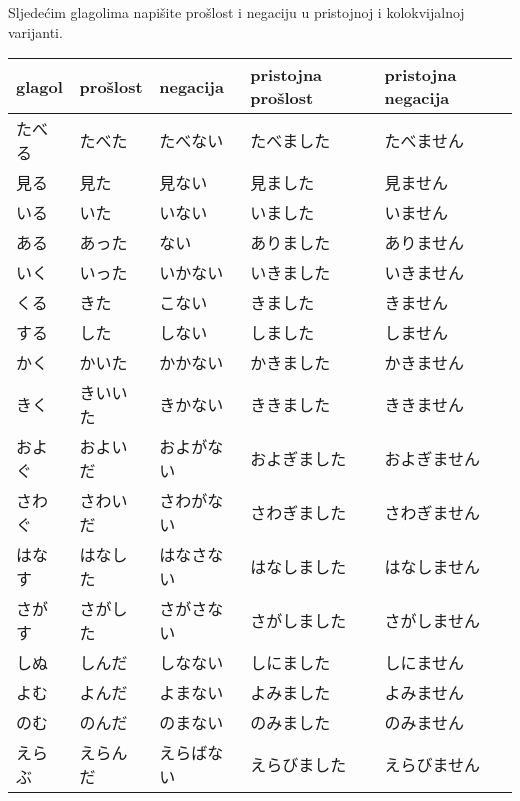
\author{Katja Kržišnik}

	\kaisetsu
	
	
	\noindent Sljedećim glagolima napišite prošlost i negaciju u pristojnoj i kolokvijalnoj varijanti.
	\vspace{15pt}
	
	     \begin{tabular}{l l l l l}\toprule[2pt]
	     	glagol &  prošlost & negacija & pristojna prošlost & pristojna negacija \\
	     	\midrule
	     	たべる & たべた & たべない & たべました & たべません \\
	     	見る & 見た & 見ない & 見ました & 見ません \\
	     	\vspace{5pt}
	     	いる & いた & いない & いました & いません \\
	     	ある & あった & ない & ありました & ありません \\
	     	いく & いった & いかない & いきました & いきません \\
	     	くる & きた & こない & きました & きません \\
	     	\vspace{5pt}
	     	する & した & しない & しました & しません \\
	     	かく & かいた & かかない & かきました & かきません \\
	     	きく & きいいた & きかない & ききました & ききません \\
	     	およぐ & およいだ & およがない & およぎました & およぎません \\
	     	さわぐ & さわいだ & さわがない & さわぎました & さわぎません \\
	     	はなす & はなした & はなさない & はなしました & はなしません \\
	     	\vspace{5pt}
	     	さがす & さがした & さがさない & さがしました & さがしません \\
	     	しぬ & しんだ & しなない & しにました & しにません \\
	     	よむ & よんだ & よまない & よみました & よみません \\
	     	のむ & のんだ & のまない & のみました & のみません \\
	     	えらぶ& えらんだ & えらばない & えらびました & えらびません \\

\end{tabular}
